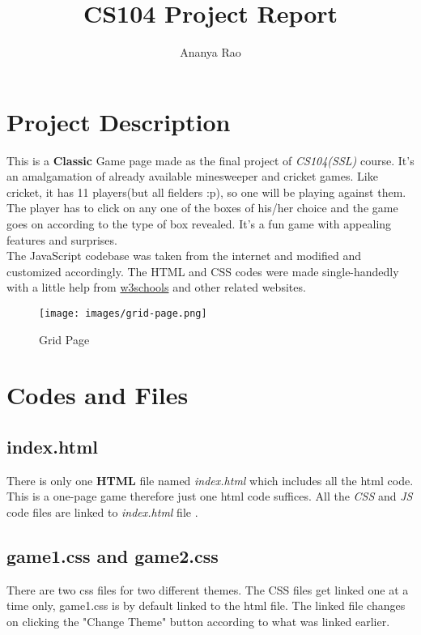 \documentclass{article}
\begin{document}
\title{CS104 Project Report}
\author{Ananya Rao}
\maketitle

\tableofcontents
\clearpage
\pagestyle{fancy}
\section{Project Description}
This is a \textbf{Classic} Game page made as the final project of \textit{CS104(SSL)} course. It's an amalgamation of already available minesweeper and cricket games. Like cricket, it has 11 players(but all fielders :p), so one will be playing against them. The player has to click on any one of the boxes of his/her choice and the game goes on according to the type of box revealed. It's a fun game with appealing features and surprises.\\ The JavaScript codebase was taken from the internet and modified and customized accordingly. The HTML and CSS codes were made single-handedly with a little help from \href{https://www.w3schools.com/}{w3schools} and other related websites. 
\begin{figure}[h]
    \centering
    \texttt{[image: images/grid-page.png]}
    \caption{Grid Page}
    \label{fig:enter-label}
\end{figure}

\section{Codes and Files}
\subsection{index.html}
There is only one \textbf{HTML} file named \textit{index.html} which includes all the html code. This is a one-page game therefore just one html code suffices.  All the \textit{CSS} and \textit{JS} code files are linked to \textit{index.html} file \cite{html:latex}. 
\subsection{game1.css and game2.css}
There are two css files for two different themes. The CSS files get linked one at a time only, game1.css is by default linked to the html file. The linked file changes on clicking the "Change Theme" button according to what was linked earlier.
\end{document}

